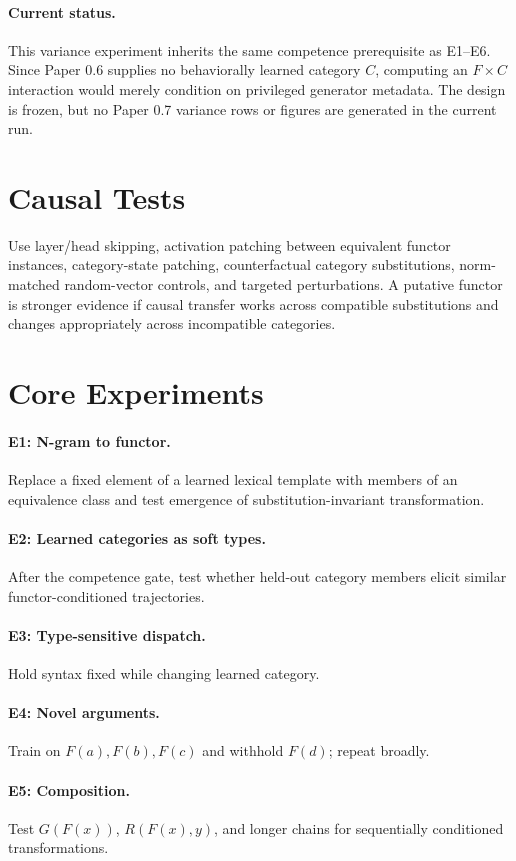 \documentclass[11pt]{article}
\begin{document}
\paragraph{Current status.} This variance experiment inherits the same competence prerequisite as E1--E6. Since Paper 0.6 supplies no behaviorally learned category $C$, computing an $F\times C$ interaction would merely condition on privileged generator metadata. The design is frozen, but no Paper 0.7 variance rows or figures are generated in the current run.

\section{Causal Tests}
Use layer/head skipping, activation patching between equivalent functor instances, category-state patching, counterfactual category substitutions, norm-matched random-vector controls, and targeted perturbations. A putative functor is stronger evidence if causal transfer works across compatible substitutions and changes appropriately across incompatible categories.

\section{Core Experiments}
\paragraph{E1: N-gram to functor.} Replace a fixed element of a learned lexical template with members of an equivalence class and test emergence of substitution-invariant transformation.
\paragraph{E2: Learned categories as soft types.} After the competence gate, test whether held-out category members elicit similar functor-conditioned trajectories.
\paragraph{E3: Type-sensitive dispatch.} Hold syntax fixed while changing learned category.
\paragraph{E4: Novel arguments.} Train on $F(a),F(b),F(c)$ and withhold $F(d)$; repeat broadly.
\paragraph{E5: Composition.} Test $G(F(x))$, $R(F(x),y)$, and longer chains for sequentially conditioned transformations.
\end{document}
